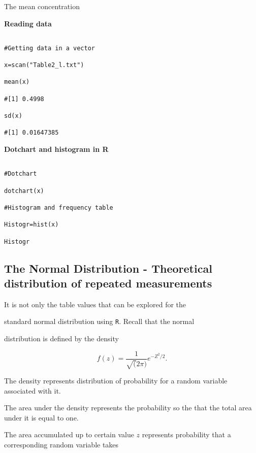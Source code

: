 The mean concentration

 

\noindent \textbf{Reading data}\\

\begin{verbatim}

#Getting data in a vector

x=scan("Table2_l.txt")

mean(x)

#[1] 0.4998

sd(x)

#[1] 0.01647385

\end{verbatim}

 

\textbf{Dotchart and histogram in R}\\

\begin{verbatim}

#Dotchart

dotchart(x)

#Histogram and frequency table

Histogr=hist(x)

Histogr

\end{verbatim}

 

\subsection{The Normal Distribution - Theoretical distribution of repeated measurements}

 

It is not only the table values that can be explored for the

standard normal distribution using \texttt{R}. Recall that the normal

distribution is defined by the density

 

\[

f(z) = \frac{1}{\sqrt(2 \pi)}e^{-Z^2/2}.

\]

 

The density represents distribution of probability for a random variable associated with it.

The area under the density represents the probability so the that the total area under it is equal to one.

The area accumulated up to certain value $z$ represents probability that a corresponding random variable takes

